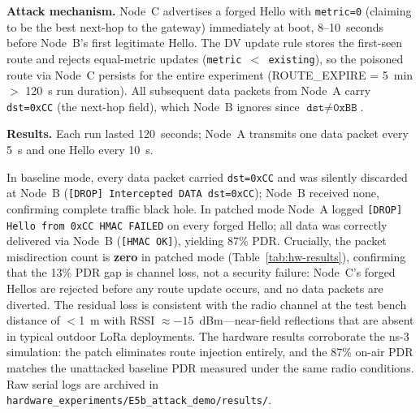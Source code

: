 \documentclass[preprint,12pt]{elsarticle}
\begin{document}
\textbf{Attack mechanism.}
Node~C advertises a forged Hello with \texttt{metric=0}
(claiming to be the best next-hop to the gateway)
immediately at boot, 8–10~seconds before Node~B's first
legitimate Hello.
The DV update rule stores the first-seen route and rejects
equal-metric updates (\texttt{metric~$<$~existing}), so the
poisoned route via Node~C persists for the entire experiment
(ROUTE\_EXPIRE = 5~min $>$ 120~s run duration).
All subsequent data packets from Node~A carry
\texttt{dst=0xCC} (the next-hop field), which Node~B ignores
since $\texttt{dst}\neq\texttt{0xBB}$.

\textbf{Results.}
Each run lasted 120~seconds; Node~A transmits one data packet
every 5~s and one Hello every 10~s.

\begin{table}[h]
  \centering
  \caption{Hardware experiment results (120~s, 923~MHz AS923,
           Ebyte EoRa-PI / ESP32-S3 + SX1262)}
  \label{tab:hw-results}
\end{table}

In baseline mode, every data packet carried \texttt{dst=0xCC}
and was silently discarded at Node~B (\texttt{[DROP] Intercepted DATA dst=0xCC});
Node~B received none, confirming complete traffic black hole.
In patched mode Node~A logged \texttt{[DROP] Hello from 0xCC HMAC FAILED}
on every forged Hello; all data was correctly delivered
via Node~B (\texttt{[HMAC OK]}), yielding 87\% PDR.
Crucially, the packet misdirection count is \textbf{zero} in patched mode
(Table~\ref{tab:hw-results}), confirming
that the 13\% PDR gap is channel loss, not a security failure:
Node~C's forged Hellos are rejected before any route update occurs,
and no data packets are diverted.
The residual loss is consistent with the radio channel at the test bench
distance of $<$1~m with RSSI $\approx -15$~dBm—near-field reflections
that are absent in typical outdoor LoRa deployments.
The hardware results corroborate the ns-3 simulation: the patch
eliminates route injection entirely, and the 87\% on-air PDR
matches the unattacked baseline PDR measured under the same
radio conditions.
Raw serial logs are archived in
\texttt{hardware\_experiments/E5b\_attack\_demo/results/}.
\end{document}
